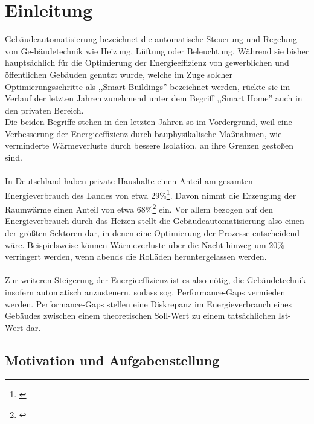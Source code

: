 \clearpage
\chapter{\textbf{Einleitung}}\label{einleitung}



Gebäudeautomatisierung bezeichnet die automatische Steuerung und Regelung von Ge-bäudetechnik 
wie Heizung, Lüftung oder Beleuchtung. Während sie bisher hauptsächlich für die Optimierung 
der Energieeffizienz von gewerblichen und öffentlichen Gebäuden genutzt wurde, welche im 
Zuge solcher Optimierungsschritte als ,,Smart Buildings'' bezeichnet werden, 
rückte sie im Verlauf der letzten Jahren zunehmend unter dem Begriff ,,Smart Home'' auch in den privaten 
Bereich.\\
Die beiden Begriffe stehen in den letzten Jahren so im Vordergrund, weil eine
Verbesserung der Energieeffizienz durch bauphysikalische Maßnahmen, wie verminderte 
Wärmeverluste durch bessere Isolation, an ihre Grenzen gestoßen sind.
\\\\
In Deutschland haben private Haushalte einen Anteil am gesamten Energieverbrauch des Landes von 
etwa 29\%\footnote[1]{\cite{Umweltbundesamt1}}. Davon nimmt die Erzeugung der Raumwärme einen Anteil
von etwa 68\%\footnote[2]{\cite{Umweltbundesamt}} ein. Vor allem bezogen
auf den Energieverbrauch durch das Heizen stellt die Gebäudeautomatisierung also einen der größten
Sektoren dar, in denen eine Optimierung der Prozesse entscheidend wäre. Beispielsweise können Wärmeverluste
über die Nacht hinweg um 20\% verringert werden, wenn abends die Rolläden heruntergelassen werden.\\\\
Zur weiteren Steigerung der Energieeffizienz ist es also nötig, die Gebäudetechnik insofern
automatisch anzusteuern, sodass sog. Performance-Gaps vermieden werden. Performance-Gaps
stellen eine Diskrepanz im Energieverbrauch eines Gebäudes zwischen einem theoretischen 
Soll-Wert zu einem tatsächlichen Ist-Wert dar.\\


\section{Motivation und Aufgabenstellung}

